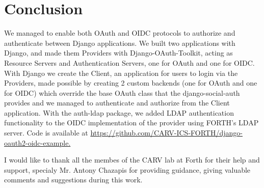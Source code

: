 \section{Conclusion}
We managed to enable both OAuth and OIDC protocols to authorize and authenticate between Django applications. We built two applications with Django, and made them Providers with Django-OAuth-Toolkit, acting as Resource Servers and Authentication Servers, one for OAuth and one for OIDC. With Django we create the Client, an application for users to login via the Providers, made possible by creating 2 custom backends (one for OAuth and one for OIDC) which override the base OAuth class that the django-social-auth provides and we managed to authenticate and authorize from the Client application. With the auth-ldap package, we added LDAP authentication functionality to the OIDC implementation of the provider using FORTH's LDAP server. Code is available at \href{https://github.com/CARV-ICS-FORTH/django-oauth2-oidc-example}{https://github.com/CARV-ICS-FORTH/django-oauth2-oidc-example.}


\begin{acks}
I would like to thank all the membes of the CARV lab at Forth for their help and support, specialy Mr. Antony Chazapis for providing guidance, giving valuable comments and suggestions during this work.
\end{acks}
